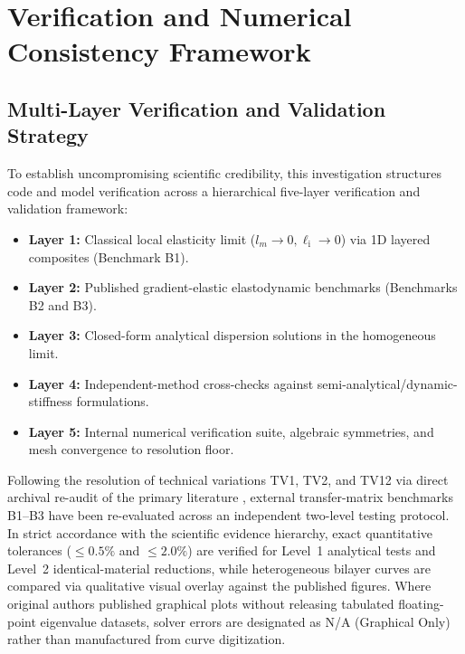 \section{Verification and Numerical Consistency Framework}
\label{sec:verification}

\subsection{Multi-Layer Verification and Validation Strategy}
To establish uncompromising scientific credibility, this investigation structures code and model verification across a hierarchical five-layer verification and validation framework:
\begin{itemize}
  \item \textbf{Layer 1:} Classical local elasticity limit ($l_m \to 0, \ell_{\mathrm{i}} \to 0$) via 1D layered composites (Benchmark B1).
  \item \textbf{Layer 2:} Published gradient-elastic elastodynamic benchmarks (Benchmarks B2 and B3).
  \item \textbf{Layer 3:} Closed-form analytical dispersion solutions in the homogeneous limit.
  \item \textbf{Layer 4:} Independent-method cross-checks against semi-analytical/dynamic-stiffness formulations.
  \item \textbf{Layer 5:} Internal numerical verification suite, algebraic symmetries, and mesh convergence to resolution floor.
\end{itemize}
Following the resolution of technical variations TV1, TV2, and TV12 via direct archival re-audit of the primary literature \cite{li2023anchorA, li2024anchorB, zhengwei2009, liweizhou2016}, external transfer-matrix benchmarks B1--B3 have been re-evaluated across an independent two-level testing protocol. In strict accordance with the scientific evidence hierarchy, exact quantitative tolerances ($\le 0.5\%$ and $\le 2.0\%$) are verified for Level~1 analytical tests and Level~2 identical-material reductions, while heterogeneous bilayer curves are compared via qualitative visual overlay against the published figures. Where original authors published graphical plots without releasing tabulated floating-point eigenvalue datasets, solver errors are designated as N/A (Graphical Only) rather than manufactured from curve digitization.

